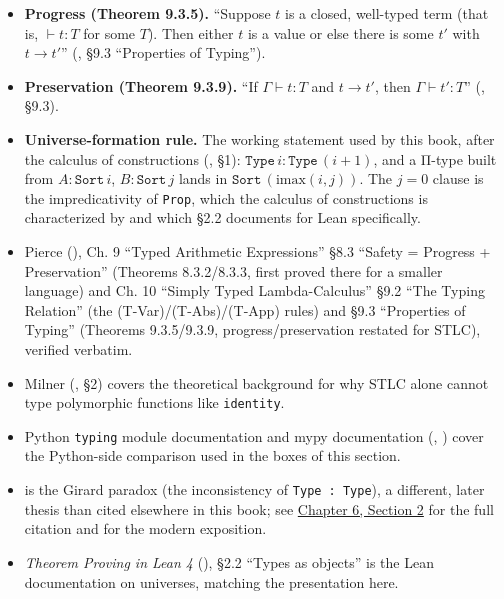 \begin{itemize}
\tightlist
\item
  \textbf{Progress (Theorem 9.3.5).} ``Suppose \(t\) is a closed, well-typed term (that is, \(\vdash t : T\) for some \(T\)). Then either \(t\) is a value or else there is some \(t'\) with \(t \to t'\)'' (\cite{Pierce2002}, §9.3 ``Properties of Typing'').
\item
  \textbf{Preservation (Theorem 9.3.9).} ``If \(\Gamma \vdash t : T\) and \(t \to t'\), then \(\Gamma \vdash t' : T\)'' (\cite{Pierce2002}, §9.3).
\item
  \textbf{Universe-formation rule.} The working statement used by this book, after the calculus of constructions (\cite{CoquandHuet1988}, §1): \(\mathtt{Type}\,i : \mathtt{Type}\,(i+1)\), and a Π-type built from \(A : \mathtt{Sort}\,i\), \(B : \mathtt{Sort}\,j\) lands in \(\mathtt{Sort}\,(\mathrm{imax}(i,j))\). The \(j = 0\) clause is the impredicativity of \texttt{Prop}, which the calculus of constructions is characterized by and which \cite{TPIL4} §2.2 documents for Lean specifically.
\item
  Pierce (\cite{Pierce2002}), Ch. 9 ``Typed Arithmetic Expressions'' §8.3 ``Safety = Progress + Preservation'' (Theorems 8.3.2/8.3.3, first proved there for a smaller language) and Ch. 10 ``Simply Typed Lambda-Calculus'' §9.2 ``The Typing Relation'' (the (T-Var)/(T-Abs)/(T-App) rules) and §9.3 ``Properties of Typing'' (Theorems 9.3.5/9.3.9, progress/preservation restated for STLC), verified verbatim.
\item
  Milner (\cite{Milner1978}, §2) covers the theoretical background for why STLC alone cannot type polymorphic functions like \texttt{identity}.
\item
  Python \texttt{typing} module documentation and mypy documentation (\cite{PythonTyping}, \cite{MypyDocs}) cover the Python-side comparison used in the boxes of this section.
\item
  \cite{Girard1972} is the Girard paradox (the inconsistency of \texttt{Type : Type}), a different, later thesis than \cite{Girard1971} cited elsewhere in this book; see \hyperref[sec:06-rigor-check:02-universes:1]{Chapter 6, Section 2} for the full citation and \cite{Coquand1986} for the modern exposition.
\item
  \emph{Theorem Proving in Lean 4} (\cite{TPIL4}), §2.2 ``Types as objects'' is the Lean documentation on universes, matching the presentation here.
\end{itemize}
